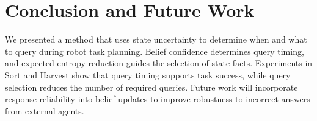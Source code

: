 \section{Conclusion and Future Work}
We presented a method that uses state uncertainty to determine when and what to query during robot task planning. Belief confidence determines query timing, and expected entropy reduction guides the selection of state facts. Experiments in Sort and Harvest show that query timing supports task success, while query selection reduces the number of required queries. Future work will incorporate response reliability into belief updates to improve robustness to incorrect answers from external agents.